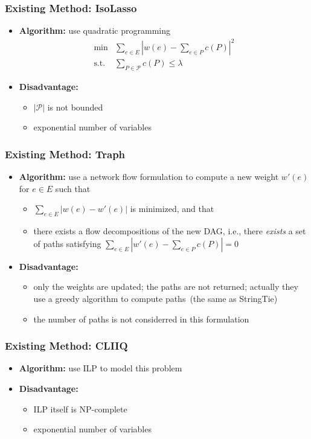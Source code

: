 \frame
{
	\frametitle{Existing Method: IsoLasso}
	\begin{itemize}
	\item {\bf Algorithm:} use quadratic programming
		\begin{displaymath}
		\begin{array}{rl}
		\min & \sum_{e\in E} | w(e) - \sum_{e\in P} c(P)|^2 \\
		\textrm{s.t.} & \sum_{P\in\mathcal{P}} c(P) \le \lambda
		\end{array}
		\end{displaymath}

	\vspace{0.2cm}
	\item {\bf Disadvantage:} 
		\begin{itemize}
		\item $|\mathcal{P}|$ is not bounded
		\item exponential number of variables
		\end{itemize}

	\end{itemize}
}


\frame
{
	\frametitle{Existing Method: Traph}
	\begin{itemize}
	\item {\bf Algorithm:} use a network flow formulation to compute a new
		weight $w'(e)$ for $e\in E$ such that
		\begin{itemize}
		\item $\sum_{e\in E} |w(e) - w'(e)|$ is minimized, and that 
		\item there exists a flow decompositions of the new DAG, i.e.,
		there \emph{exists} a set of paths satisfying $\sum_{e\in E} | w'(e) - \sum_{e\in P} c(P)| = 0$
		\end{itemize}
	\vspace{0.4cm}
	\item {\bf Disadvantage:} 
		\begin{itemize}
		\item only the weights are updated; the paths are not returned; actually
			they use a greedy algorithm to compute paths~(the same as StringTie)
		\vspace{0.2cm}
		\item the number of paths is not considerred in this formulation
		\end{itemize}
	\end{itemize}
}

\frame
{
	\frametitle{Existing Method: CLIIQ}
	\begin{itemize}
	\item {\bf Algorithm:} use ILP to model this problem
	\vspace{0.5cm}
	\item {\bf Disadvantage:} 
		\begin{itemize} 
		\item ILP itself is NP-complete
		\item exponential number of variables
		\end{itemize}
	\end{itemize}
}

